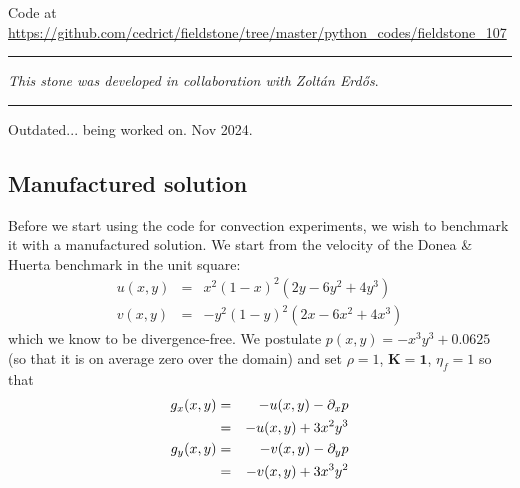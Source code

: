 
%

\begin{center}
Code at \url{https://github.com/cedrict/fieldstone/tree/master/python_codes/fieldstone_107}
\end{center}

\par\noindent\rule{\textwidth}{0.4pt}

{\sl This stone was developed in collaboration with Zolt{\'a}n Erd{\H{o}}s}. 

\par\noindent\rule{\textwidth}{0.4pt}


{\large Outdated... being worked on. Nov 2024.}



\subsection*{Manufactured solution}

Before we start using the code for convection experiments, we wish to benchmark it
with a manufactured solution. 
We start from the velocity of the Donea \& Huerta benchmark in the unit square:
\begin{eqnarray}
u(x,y) &=& x^2(1- x)^2 (2y - 6y^2 + 4y^3)  \\
v(x,y) &=& -y^2 (1 - y)^2 (2x - 6x^2 + 4x^3) 
\end{eqnarray}
which we know to be divergence-free.
We postulate $p(x,y)=-x^3y^3+0.0625$ (so that it is on average zero over the domain) 
and set $\rho=1$, ${\bm K}={\bm 1}$, $\eta_f=1$ so that 
\begin{eqnarray} 
g_x(x,y) 
&=& -u(x,y) - \partial_x p \nonumber\\
&=& -u(x,y) +3x^2y^3 \nonumber\\ 
g_y(x,y)  
&=& -v(x,y) - \partial_y p \nonumber\\ 
&=& -v(x,y) +3x^3y^2 \nonumber
\end{eqnarray}

